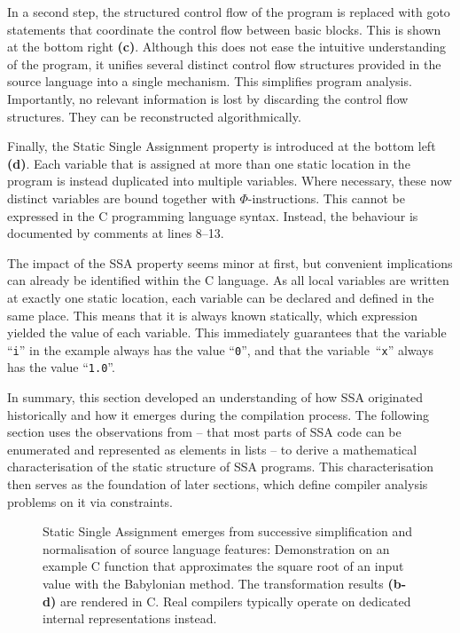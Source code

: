     In a second step, the structured control flow of the program is replaced
    with goto statements that coordinate the control flow between basic blocks.
    This is shown at the bottom right {\bf(c)}.
    Although this does not ease the intuitive understanding of the program, it
    unifies several distinct control flow structures provided in the source
    language into a single mechanism.
    This simplifies program analysis.
    Importantly, no relevant information is lost by discarding the control flow
    structures.
    They can be reconstructed algorithmically.

    Finally, the Static Single Assignment property is introduced at the bottom
    left {\bf(d)}.
    Each variable that is assigned at more than one static location in the
    program is instead duplicated into multiple variables.
    Where necessary, these now distinct variables are bound together with
    $\Phi$-instructions.
    This cannot be expressed in the C programming language syntax.
    Instead, the behaviour is documented by comments at lines 8--13.

    The impact of the SSA property seems minor at first, but convenient
    implications can already be identified within the C language.
    As all local variables are written at exactly one static location, each
    variable can be declared and defined in the same place.
    This means that it is always known statically, which expression yielded the
    value of each variable.
    This immediately guarantees that the variable ``{\tt i}'' in the example
    always has the value ``{\tt 0}'', and that the variable~``{\tt x}'' always
    has the value ``{\tt 1.0}''.

    In summary, this section developed an understanding of how SSA originated
    historically and how it emerges during the compilation process.
    The following section uses the observations from
     -- that most parts of SSA code can be enumerated
    and represented as elements in lists -- to derive a mathematical
    characterisation of the static structure of SSA programs.
    This characterisation then serves as the foundation of later sections, which
    define compiler analysis problems on it via constraints.

\begin{figure}[p]
    
    \caption{Static Single Assignment emerges from successive simplification
             and normalisation of source language features: 
             Demonstration on an example C function that approximates the
             square root of an input value with the Babylonian method.
             The transformation results {\bf (b-d)} are rendered in C.
             Real compilers typically operate on
             dedicated internal representations instead.}
    \label{ssaexample}
\end{figure}

